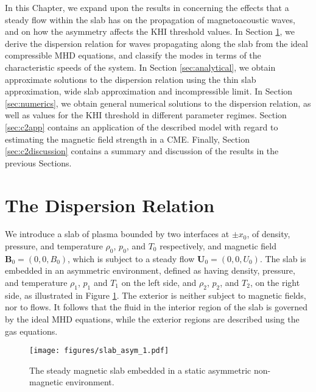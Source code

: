 In this Chapter, we expand upon the results in \cite{Barbulescu2018} concerning the effects that a steady flow within the slab has on the propagation of magnetoacoustic waves, and on how the asymmetry affects the KHI threshold values.
In Section \ref{sec:disprelslab}, we derive the dispersion relation for waves propagating along the slab from the ideal compressible MHD equations, and classify the modes in terms of the characteristic speeds of the system.
In Section \ref{sec:analytical}, we obtain approximate solutions to the dispersion relation using the thin slab approximation, wide slab approximation and incompressible limit.
In Section \ref{sec:numerics}, we obtain general numerical solutions to the dispersion relation, as well as values for the KHI threshold in different parameter regimes.
Section \ref{sec:c2app} contains an application of the described model with regard to estimating the magnetic field strength in a CME.
Finally, Section \ref{sec:c2discussion} contains a summary and discussion of the results in the previous Sections.



\section{The Dispersion Relation}
\label{sec:disprelslab}

We introduce a slab of plasma bounded by two interfaces at $\pm x_0$, of density, pressure, and temperature $\rho_0$, $p_0$, and $T_0$ respectively, and magnetic field $\mathbf{B}_0 = (0, 0, B_0)$, which is subject to a steady flow $\mathbf{U}_0 = (0, 0, U_0)$.
The slab is embedded in an asymmetric environment, defined as having density, pressure, and temperature $\rho_1$, $p_1$ and $T_1$ on the left side, and $\rho_2$, $p_2$, and $T_2$, on the right side, as illustrated in Figure \ref{slab}.
The exterior is neither subject to magnetic fields, nor to flows.
It follows that the fluid in the interior region of the slab is governed by the ideal MHD equations, while the exterior regions are described using the gas equations.

%
\begin{figure}[ht]
\centering
 \texttt{[image: figures/slab\_asym\_1.pdf]}
 \caption{The steady magnetic slab embedded in a static asymmetric non-magnetic environment.}
 \label{slab}
\end{figure}
%



